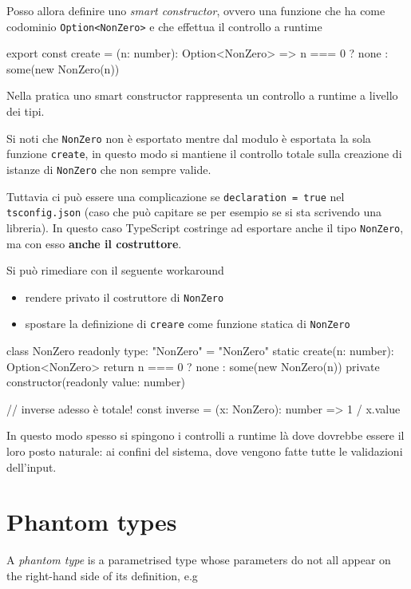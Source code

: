 \documentclass[12pt]{article}
\theoremstyle{definition}
\newenvironment{code}
  {\vspace{0.5cm} \VerbatimEnvironment\begin{typescriptcode}}
  {\end{typescriptcode} \vspace{0.2cm}}
\begin{document}
Posso allora definire uno \emph{smart constructor}, ovvero una funzione che ha come codominio \texttt{Option<NonZero>} e che
effettua il controllo a runtime

\begin{code}
export const create = (n: number): Option<NonZero> =>
  n === 0 ? none : some(new NonZero(n))
\end{code}

Nella pratica uno smart constructor rappresenta un controllo a runtime a livello dei tipi.

Si noti che \texttt{NonZero} non è esportato mentre dal modulo è esportata la sola funzione \texttt{create}, in questo
modo si mantiene il controllo totale sulla creazione di istanze di \texttt{NonZero} che non sempre valide.

Tuttavia ci può essere una complicazione se \texttt{declaration = true} nel \texttt{tsconfig.json}
(caso che può capitare se per esempio se si sta scrivendo una libreria). In questo caso
TypeScript costringe ad esportare anche il tipo \texttt{NonZero}, ma con esso \textbf{anche il costruttore}.

Si può rimediare con il seguente workaround

\begin{itemize}
\item rendere privato il costruttore di \texttt{NonZero}
\item spostare la definizione di \texttt{creare} come funzione statica di \texttt{NonZero}
\end{itemize}

\begin{code}
class NonZero {
  readonly type: "NonZero" = "NonZero"
  static create(n: number): Option<NonZero> {
    return n === 0 ? none : some(new NonZero(n))
  }
  private constructor(readonly value: number) {}
}

// inverse adesso è totale!
const inverse = (x: NonZero): number => 1 / x.value
\end{code}

In questo modo spesso si spingono i controlli a runtime là dove dovrebbe essere il loro posto naturale: ai confini del sistema,
dove vengono fatte tutte le validazioni dell'input.

\newpage
\section{Phantom types}

A \emph{phantom type} is a parametrised type whose parameters do not all appear on the right-hand side of its definition, e.g
\end{document}
